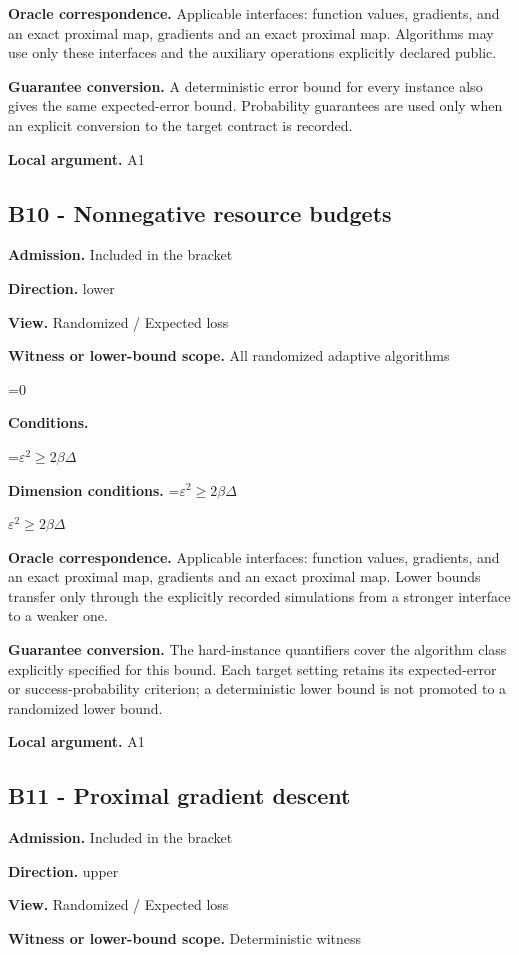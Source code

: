 \documentclass[10pt,a4paper]{article}
\newcommand{\AtlasMath}[1]{\par\begingroup\centering\setbox0=\hbox{$\displaystyle #1$}\ifdim\wd0>1.4\linewidth\typeout{ATLAS WIDE FORMULA: \the\wd0}\fi\ifdim\wd0>\linewidth\resizebox{\linewidth}{!}{\box0}\else\box0\fi\par\endgroup}
\newcommand{\AtlasInlineMath}[1]{\begingroup\setbox0=\hbox{$#1$}\ifdim\wd0>.4\linewidth\endgroup\AtlasMath{#1}\else\endgroup$#1$\fi}
\begin{document}
\textbf{Oracle correspondence.} Applicable interfaces: function values, gradients, and an exact proximal map, gradients and an exact proximal map. Algorithms may use only these interfaces and the auxiliary operations explicitly declared public.

\textbf{Guarantee conversion.} A deterministic error bound for every instance also gives the same expected-error bound. Probability guarantees are used only when an explicit conversion to the target contract is recorded.

\textbf{Local argument.} A1

\subsection{B10 - Nonnegative resource budgets}
\textbf{Admission.} Included in the bracket

\textbf{Direction.} lower

\textbf{View.} Randomized / Expected loss

\textbf{Witness or lower-bound scope.} All randomized adaptive algorithms

\AtlasMath{0}
\textbf{Conditions.} 
\AtlasMath{\varepsilon^2\ge2\beta\Delta}


\textbf{Dimension conditions.} \AtlasInlineMath{\varepsilon^2\ge2\beta\Delta}

\textbf{Oracle correspondence.} Applicable interfaces: function values, gradients, and an exact proximal map, gradients and an exact proximal map. Lower bounds transfer only through the explicitly recorded simulations from a stronger interface to a weaker one.

\textbf{Guarantee conversion.} The hard-instance quantifiers cover the algorithm class explicitly specified for this bound. Each target setting retains its expected-error or success-probability criterion; a deterministic lower bound is not promoted to a randomized lower bound.

\textbf{Local argument.} A1

\subsection{B11 - Proximal gradient descent}
\textbf{Admission.} Included in the bracket

\textbf{Direction.} upper

\textbf{View.} Randomized / Expected loss

\textbf{Witness or lower-bound scope.} Deterministic witness
\end{document}
